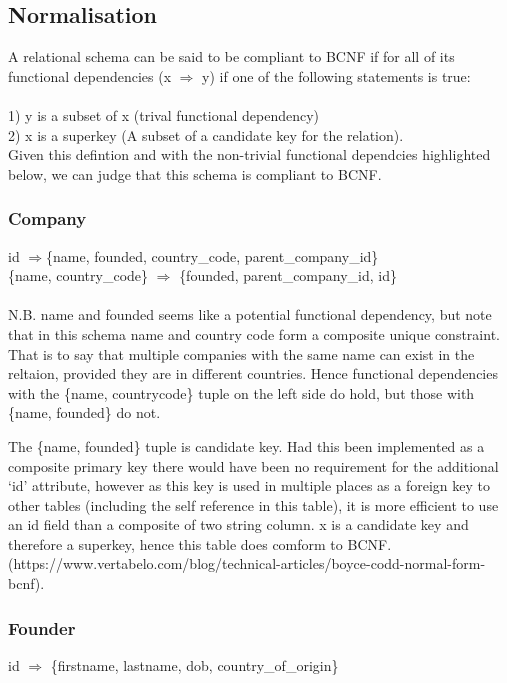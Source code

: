 \documentclass[12pt]{article}
\begin{document}
\subsection{Normalisation}
A relational schema can be said to be compliant to BCNF if for all of its functional dependencies (x $\Rightarrow$ y) if one of the following statements is true: \\\\
1) y is a subset of x (trival functional dependency) \\
2) x is a superkey (A subset of a candidate key for the relation). \\
Given this defintion and with the non-trivial functional dependcies highlighted below, we can judge that this schema is compliant to BCNF.

\subsubsection{Company}

id $\Rightarrow${\{name, founded, country\_code, parent\_company\_id\}} \\
\{{name, country\_code\}} $\Rightarrow$ {\{founded, parent\_company\_id, id\}} \\

\\ N.B. name and founded seems like a potential functional dependency, but note that in this schema name and country code form a composite unique constraint. That is to say that multiple companies with the same name can exist in the reltaion, provided they are in different countries. Hence functional dependencies with the \{{name, countrycode\}} tuple on the left side do hold, but those with \{{name, founded\}} do not.

The \{{name, founded\}} tuple is candidate key. Had this been implemented as a composite primary key there would have been no requirement for the additional `id' attribute, however as this key is used in multiple places as a foreign key to other tables (including the self reference in this table), it is more efficient to use an id field than a composite of two string column. x is a candidate key and therefore a superkey, hence this table does comform to BCNF. (https://www.vertabelo.com/blog/technical-articles/boyce-codd-normal-form-bcnf).

\subsubsection{Founder}
id $\Rightarrow$ \{{firstname, lastname, dob, country\_of\_origin\}}\\
\end{document}
